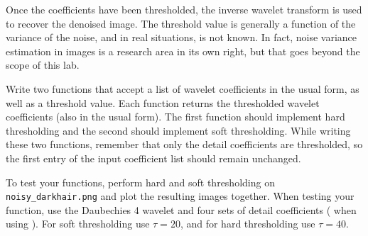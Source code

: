 Once the coefficients have been thresholded, the inverse wavelet transform is used to recover the denoised image.
The threshold value is generally a function of the variance of the noise, and in real situations, is not known.
In fact, noise variance estimation in images is a research area in its own right, but that goes beyond the scope of this lab.


\begin{problem}
Write two functions that accept a list of wavelet coefficients in the usual form, as well as a threshold value. Each function returns the thresholded wavelet coefficients (also in the usual form). The first function should implement hard thresholding and the second should implement soft thresholding.
While writing these two functions, remember that only the detail coefficients are thresholded, so the first entry of the input coefficient list should remain unchanged.

To test your functions, perform hard and soft thresholding on \texttt{noisy\_darkhair.png} and plot the resulting images together.
When testing your function, use the Daubechies 4 wavelet and four sets of detail coefficients ( when using ).
For soft thresholding use $\tau=20$, and for hard thresholding use $\tau=40$.
\end{problem}

\begin{comment}
\begin{problem}
Create a noisy version of the Lena image by adding Gaussian
white noise of mean 0 and standard deviation $\sigma = 20$ (i.e. \li{scale=20}).
Compute four levels of the wavelet coefficients using the Daubechies 4 Wavelet,
and input these into your
thresholding functions (with $\tau = 3\sigma$ for the hard threshold,
and $\tau = 3\sigma/2$ for the soft threshold). Reconstruct the
two denoised images, and then plot these together alongside the
noisy image. Your output should match Figure \ref{fig:denoise}.

What do you notice? How does lowering or raising the
threshold affect the reconstructed images? What happens if you use
a different Wavelet?
\end{problem}
\end{comment}


